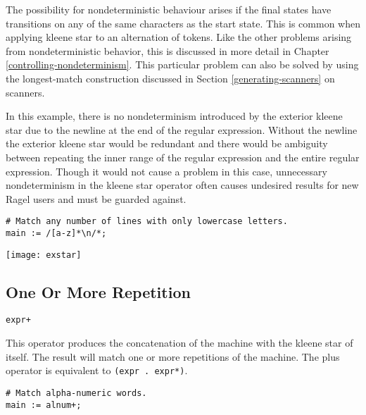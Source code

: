 \documentclass[letterpaper,11pt,oneside]{book}
\newcommand{\verbspace}{\vspace{10pt}}
\newcommand{\graphspace}{\vspace{10pt}}
\newenvironment{inline_code}{\def\baselinestretch{1}\vspace{12pt}\small}{}
\begin{document}
The possibility for nondeterministic behaviour arises if the final states have
transitions on any of the same characters as the start state.  This is common
when applying kleene star to an alternation of tokens. Like the other problems
arising from nondeterministic behavior, this is discussed in more detail in Chapter
\ref{controlling-nondeterminism}. This particular problem can also be solved
by using the longest-match construction discussed in Section 
\ref{generating-scanners} on scanners.

In this 
example, there is no nondeterminism introduced by the exterior kleene star due to
the newline at the end of the regular expression. Without the newline the
exterior kleene star would be redundant and there would be ambiguity between
repeating the inner range of the regular expression and the entire regular
expression. Though it would not cause a problem in this case, unnecessary
nondeterminism in the kleene star operator often causes undesired results for
new Ragel users and must be guarded against.

\begin{inline_code}
\begin{verbatim}
# Match any number of lines with only lowercase letters.
main := /[a-z]*\n/*;
\end{verbatim}
\end{inline_code}

\graphspace
\begin{center}
\texttt{[image: exstar]}
\end{center}
\graphspace

\subsection{One Or More Repetition}

\verb|expr+|
\verbspace

This operator produces the concatenation of the machine with the kleene star of
itself. The result will match one or more repetitions of the machine. The plus
operator is equivalent to \verb|(expr . expr*)|.  

\begin{inline_code}
\begin{verbatim}
# Match alpha-numeric words.
main := alnum+;
\end{verbatim}
\end{inline_code}
\end{document}
